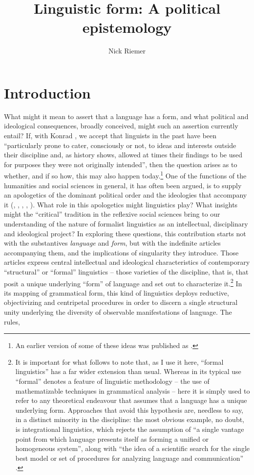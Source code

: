 \documentclass[output=paper]{langscibook}
\author{Nick Riemer \affiliation{The University of Sydney \& Laboratoire d’histoire des théories linguistiques, Université Paris-Diderot}}
\title{Linguistic form: A political epistemology}
\begin{document}
\maketitle

\section{Introduction}
\label{sec:riemer:intro}

What might it mean to assert that a language has a form, and what political and ideological consequences, broadly conceived, might such an assertion currently entail? If, with Konrad \citet{Koerner1999}, we accept that linguists in the past have been ``particularly prone to cater, consciously or not, to ideas and interests outside their discipline and, as history shows, allowed at times their findings to be used for purposes they were not originally intended'', then the question arises as to whether, and if so how, this may also happen today.\footnote{An earlier version of some of these ideas was published as \citet{Riemer2016div}.} One of the functions of the humanities and social sciences in general, it has often been argued, is to supply an apologetics of the dominant political order and the ideologies that accompany it (\citealt{Nizan19711932}, \citealt{Chomsky19781967}, \citealt{Ingleby1972}, \citealt{Baudrillard19881972}, \citealt{Bourdieu1991}). What role in this apologetics might linguistics play? What insights might the ``critical'' tradition in the reflexive social sciences bring to our understanding of the nature of formalist linguistics as an intellectual, disciplinary and ideological project? In exploring these questions, this contribution starts not with the substantives \emph{language} and \emph{form}, but with the indefinite articles accompanying them, and the implications of singularity they introduce. Those articles express central intellectual and ideological characteristics of contemporary ``structural'' or ``formal'' linguistics -- those varieties of the discipline, that is, that posit a unique underlying ``form'' of language and set out to characterize it.\footnote{It is important for what follows to note that, as I use it here, ``formal linguistics'' has a far wider extension than usual. Whereas in its typical use ``formal'' denotes a feature of linguistic methodology -- the use of mathematizable techniques in grammatical analysis -- here it is simply used to refer to any theoretical endeavour that assumes that a language has a unique underlying form. Approaches that avoid this hypothesis are, needless to say, in a distinct minority in the discipline: the most obvious example, no doubt, is integrational linguistics, which rejects the assumption of ``a single vantage point from which language presents itself as forming a unified or homogeneous system'', along with ``the idea of a scientific search for the single best model or set of procedures for analyzing language and communication'' \citep[4, 15]{PableHutton2015}.} In its mapping of grammatical form, this kind of  linguistics deploys reductive, objectivizing and centripetal procedures in order to discern a single structural unity underlying the diversity of observable manifestations of language. The rules, 
\end{document}
